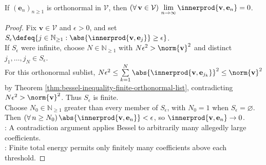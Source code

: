 \begin{corollary} \label{cor:orthonormal-sequence-coefficients-vanish} \\
If $(\mathbf{e}_n)_{n\geq1}$ is orthonormal in $\mathcal{V}$, then $(\forall\,\mathbf{v}\in\mathcal{V})\,\lim\limits_{n\to\infty}\innerprod{\mathbf{v},\mathbf{e}_n}=0$.
\begin{proof}
Fix $\mathbf{v}\in\mathcal{V}$ and $\epsilon>0$, and set $S_{\epsilon}\defeq\{j\in\mathbb{N}_{\geq1}:\abs{\innerprod{\mathbf{v},\mathbf{e}_j}}\geq\epsilon\}$.\\
If $S_{\epsilon}$ were infinite, choose $N\in\mathbb{N}_{\geq1}$ with $N\epsilon^2>\norm{\mathbf{v}}^2$ and distinct $j_1,\ldots,j_N\in S_{\epsilon}$.\\
For this orthonormal sublist, $N\epsilon^2\leq\sum\limits_{k=1}^{N}\abs{\innerprod{\mathbf{v},\mathbf{e}_{j_k}}}^2\leq\norm{\mathbf{v}}^2$ by Theorem \ref{thm:bessel-inequality-finite-orthonormal-list}, contradicting $N\epsilon^2>\norm{\mathbf{v}}^2$. Thus $S_{\epsilon}$ is finite.\\
Choose $N_0\in\mathbb{N}_{\geq1}$ greater than every member of $S_{\epsilon}$, with $N_0=1$ when $S_{\epsilon}=\varnothing$. Then $(\forall\,n\geq N_0)\,\abs{\innerprod{\mathbf{v},\mathbf{e}_n}}<\epsilon$, so $\innerprod{\mathbf{v},\mathbf{e}_n}\to0$.\\
: A contradiction argument applies Bessel to arbitrarily many allegedly large coefficients.\\
: Finite total energy permits only finitely many coefficients above each threshold.
\end{proof}
\end{corollary}


